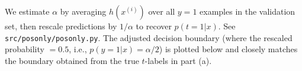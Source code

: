 \begin{answer}
We estimate $\alpha$ by averaging $h(x^{(i)})$ over all $y=1$ examples in the validation set, then rescale predictions by $1/\alpha$ to recover $p(t=1|x)$. See \texttt{src/posonly/posonly.py}. The adjusted decision boundary (where the rescaled probability $= 0.5$, i.e., $p(y=1|x) = \alpha/2$) is plotted below and closely matches the boundary obtained from the true $t$-labels in part (a).
\end{answer}

